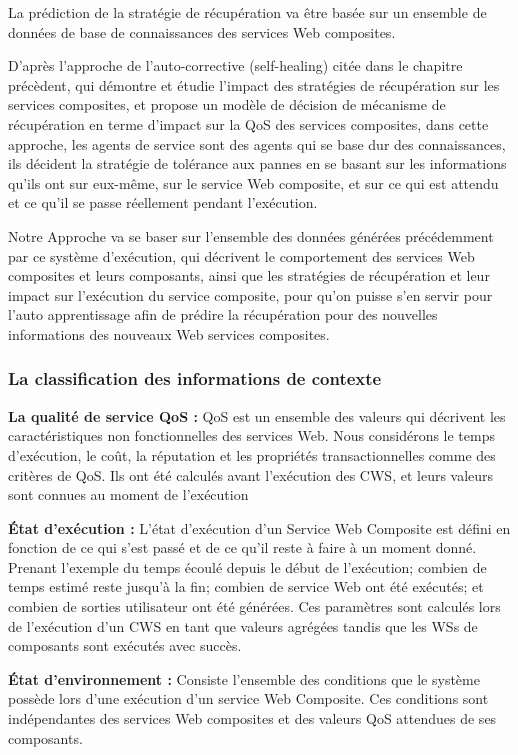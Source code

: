 La prédiction de la stratégie de récupération va être basée sur un ensemble de données de base de connaissances des services Web composites.

D'après l'approche de l'auto-corrective (self-healing) citée dans le chapitre précèdent, qui démontre et étudie l'impact des stratégies de récupération sur les services composites, et propose un modèle de décision de mécanisme de récupération en terme d'impact sur la QoS des services composites, dans cette approche, les agents de service sont des agents qui se base dur des connaissances, ils décident la stratégie de tolérance aux pannes en se basant sur les informations qu'ils ont sur eux-même, sur le service Web composite, et sur ce qui est attendu et ce qu'il se passe réellement pendant l'exécution.\cite{1}

Notre Approche va se baser sur l'ensemble des données générées précédemment par ce système d'exécution, qui décrivent le comportement des services Web composites et leurs composants, ainsi que les stratégies de récupération et leur impact sur l'exécution du service composite, pour qu'on puisse s'en servir pour l'auto apprentissage afin de prédire la récupération pour des nouvelles informations des nouveaux Web services composites.

\subsubsection{La classification des informations de contexte}


\textbf{La qualité de service QoS :}  QoS est un ensemble des valeurs qui décrivent les caractéristiques non fonctionnelles des services Web. Nous considérons le temps d'exécution, le coût, la réputation et les propriétés transactionnelles comme des critères de QoS. Ils ont été calculés avant l'exécution des CWS, et leurs valeurs sont connues au moment de l'exécution \cite{2}

\textbf{État d'exécution :}  L'état d'exécution d'un Service Web Composite est défini en fonction de ce qui s'est passé et de ce qu'il reste à faire à un moment donné.
Prenant l'exemple du temps écoulé depuis le début de l'exécution; combien de temps estimé reste jusqu'à la fin; combien de service Web ont été exécutés; et combien de sorties utilisateur ont été générées. Ces paramètres sont calculés lors de l'exécution d'un CWS en tant que valeurs agrégées tandis que les WSs de composants sont exécutés avec succès.

\textbf{État d'environnement :} Consiste l'ensemble des conditions que le système possède lors d'une exécution d'un service Web Composite. Ces conditions sont indépendantes des services Web composites et des valeurs QoS attendues de ses composants.


